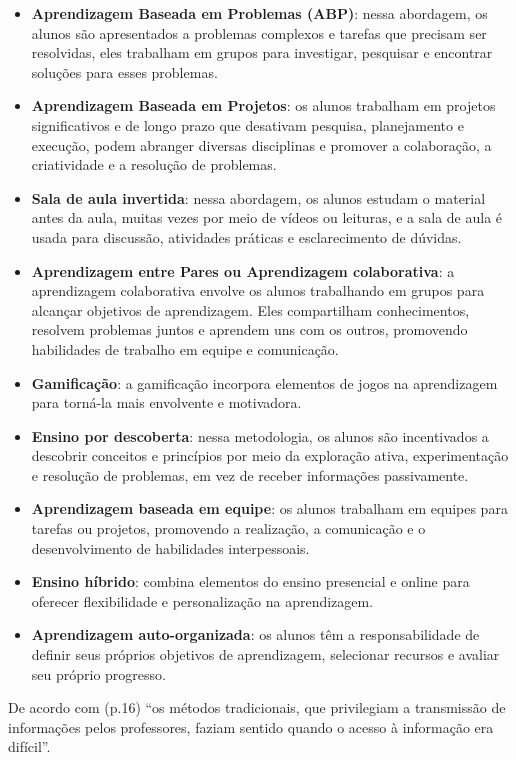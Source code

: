 \begin{itemize}
    \item \textbf{Aprendizagem Baseada em Problemas (ABP)}: nessa abordagem, os alunos são apresentados a problemas complexos e tarefas que precisam ser resolvidas, eles trabalham em grupos para investigar, pesquisar e encontrar soluções para esses problemas.
    \item \textbf{Aprendizagem Baseada em Projetos}: os alunos trabalham em projetos significativos e de longo prazo que desativam pesquisa, planejamento e execução, podem abranger diversas disciplinas e promover a colaboração, a criatividade e a resolução de problemas.
    \item \textbf{Sala de aula invertida}: nessa abordagem, os alunos estudam o material antes da aula, muitas vezes por meio de vídeos ou leituras, e a sala de aula é usada para discussão, atividades práticas e esclarecimento de dúvidas.
    \item \textbf{Aprendizagem entre Pares ou Aprendizagem colaborativa}: a aprendizagem colaborativa envolve os alunos trabalhando em grupos para alcançar objetivos de aprendizagem. Eles compartilham conhecimentos, resolvem problemas juntos e aprendem uns com os outros, promovendo habilidades de trabalho em equipe e comunicação.
    \item \textbf{Gamificação}: a gamificação incorpora elementos de jogos na aprendizagem para torná-la mais envolvente e motivadora.
    \item \textbf{Ensino por descoberta}: nessa metodologia, os alunos são incentivados a descobrir conceitos e princípios por meio da exploração ativa, experimentação e resolução de problemas, em vez de receber informações passivamente.
    \item \textbf{Aprendizagem baseada em equipe}: os alunos trabalham em equipes para tarefas ou projetos, promovendo a realização, a comunicação e o desenvolvimento de habilidades interpessoais.
    \item \textbf{Ensino híbrido}: combina elementos do ensino presencial e online para oferecer flexibilidade e personalização na aprendizagem.
    \item \textbf{Aprendizagem auto-organizada}: os alunos têm a responsabilidade de definir seus próprios objetivos de aprendizagem, selecionar recursos e avaliar seu próprio progresso.
\end{itemize}

De acordo com  (p.16) ``os métodos tradicionais, que privilegiam a transmissão de informações pelos professores, faziam sentido quando o acesso à informação era difícil''.

